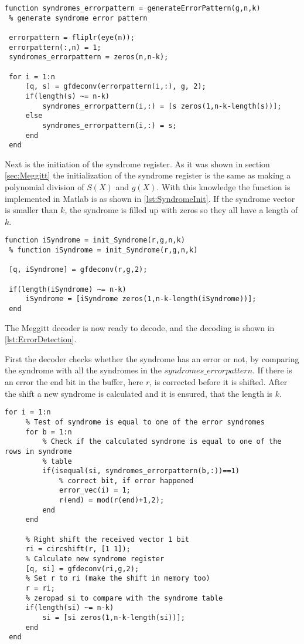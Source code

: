 \documentclass[Main]{subfiles}
\begin{document}
\begin{lstlisting}[caption=Error Pattern Creation, style=Code-Matlab, label=lst:ErrorPatternCreate]
 function syndromes_errorpattern = generateErrorPattern(g,n,k)
 % generate syndrome error pattern
 
 errorpattern = fliplr(eye(n));
 errorpattern(:,n) = 1;
 syndromes_errorpattern = zeros(n,n-k);
 
 for i = 1:n
     [q, s] = gfdeconv(errorpattern(i,:), g, 2);
     if(length(s) ~= n-k)
         syndromes_errorpattern(i,:) = [s zeros(1,n-k-length(s))];
     else
         syndromes_errorpattern(i,:) = s;
     end
 end
\end{lstlisting}

Next is the initiation of the syndrome register.
As it was shown in section \ref{sec:Meggitt} the initialization of the syndrome register is the same as making a polynomial division of $S(X)$ and $g(X)$. With this knowledge the function is implemented in Matlab is as shown in \codeTitle \ref{lst:SyndromeInit}.
If the syndrome vector is smaller than $k$, the syndrome is filled up with zeros so they all have a length of $k$.

\begin{lstlisting}[caption=Syndrome Initialization, style=Code-Matlab, label=lst:SyndromeInit]
 function iSyndrome = init_Syndrome(r,g,n,k)
 % function iSyndrome = init_Syndrome(r,g,n,k)
 
 [q, iSyndrome] = gfdeconv(r,g,2);
 
 if(length(iSyndrome) ~= n-k)
     iSyndrome = [iSyndrome zeros(1,n-k-length(iSyndrome))];
 end
\end{lstlisting}

The Meggitt decoder is now ready to decode, and the decoding is shown in \codeTitle \ref{lst:ErrorDetection}.

First the decoder checks whether the syndrome has an error or not, by comparing the syndrome with all the syndromes in the $syndromes\_errorpattern$.
If there is an error the end bit in the buffer, here $r$, is corrected before it is shifted.
After the shift a new syndrome is calculated and it is ensured, that the length is $k$.

\begin{lstlisting}[caption=Error Detection, style=Code-Matlab, label=lst:ErrorDetection]
 for i = 1:n
     % Test of syndrome is equal to one of the error syndromes
     for b = 1:n
         % Check if the calculated syndrome is equal to one of the rows in syndrome
         % table
         if(isequal(si, syndromes_errorpattern(b,:))==1)
             % correct bit, if error happened
             error_vec(i) = 1;
             r(end) = mod(r(end)+1,2);
         end
     end
     
     % Right shift the received vector 1 bit
     ri = circshift(r, [1 1]);
     % Calculate new syndrome register
     [q, si] = gfdeconv(ri,g,2);
     % Set r to ri (make the shift in memory too)
     r = ri;
     % zeropad si to compare with the syndrome table
     if(length(si) ~= n-k)
         si = [si zeros(1,n-k-length(si))];
     end
 end
\end{lstlisting}
\end{document}
